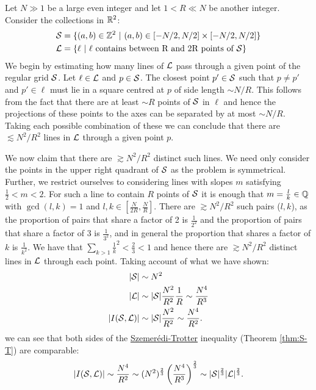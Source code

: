 \begin{example}
    Let $N \gg 1$ be a large even integer and let $1<R \ll N$ be another integer. Consider the collections in $\mathbb R^2$:
    \begin{align*}
        \mathcal S &= \{ (a,b) \in \mathbb Z^2 \ | \ (a,b) \in [-N/2,N/2] \times [-N/2,N/2] \} \\
        \mathcal L &= \{ \ell \ | \ \ell \text{ contains between R and 2R points of } \mathcal S \} \end{align*}
    We begin by estimating how many lines of $\mathcal L$ pass through a given point of the regular grid $\mathcal S$.
    Let $\ell \in \mathcal L$ and $p \in \mathcal S$. The closest point $p' \in \mathcal S$ such that $p \neq p'$ and $p' \in \ell$ must lie
    in a square centred at $p$ of side length $\sim N/R$. This follows from the fact that there are at least $\sim R$ points of $\mathcal S$ in $\ell$ and hence the
    projections of these points to the axes can be separated by at most $\sim N/R$. Taking each possible combination of these we can conclude that there are $\lesssim N^2 / R^2$ lines in $\mathcal L$ through a
    given point $p$.

    We now claim that there are $\gtrsim N^2 / R^2$ distinct such lines. We need only consider the points in the upper right quadrant of $\mathcal S$ as the problem is symmetrical.
    Further, we restrict ourselves to considering lines with slopes $m$ satisfying $\frac{1}{2} < m < 2$. For such a line to contain $R$  points
    of $\mathcal S$ it is enough that $m= \frac{l}{k} \in \mathbb Q$ with $\gcd(l,k) =1$ and $l,k \in \left[\frac{N}{2R}, \frac{N}{R} \right]$. There are $\gtrsim N^2/R^2$ such pairs ($l,k$), as the proportion of pairs that share a factor of 2 is $\frac{1}{2^2}$ and the proportion of pairs that share a factor 
    of 3 is $\frac{1}{3^2}$, and in general the proportion that shares a factor of $k$ is $\frac{1}{k^2}$. We have that $\sum_{k>1} \frac{1}{k}^2 < \frac{2}{3} < 1$ and hence there are $\gtrsim N^2 /R^2$ distinct
    lines in $\mathcal L$ through each point. Taking account of what we have shown: 
    \begin{align*}
        |\mathcal S| &\sim N^2 \\ 
        |\mathcal L| &\sim |\mathcal S| \frac{N^2}{R^2} \frac{1}{R} \sim \frac{N^4}{R^3}\\
        |I(\mathcal S, \mathcal L)| &\sim |\mathcal S| \frac{N^2}{R^2} \sim \frac{N^4}{R^2}.\\
    \end{align*}
    we can see that both sides of the \hyperref[thm:S-T]{Szemerédi-Trotter} inequality (Theorem \ref{thm:S-T}) are comparable:
    \[
    |I(\mathcal S, \mathcal L)| \sim \frac{N^4}{R^2} \sim (N^2)^{\frac{2}{3}} \left(\frac{N^4}{R^3}\right)^{\frac{2}{3}} \sim |\mathcal S|^{\frac{2}{3}}|\mathcal L|^{\frac{2}{3}}.
    \]
\end{example}



